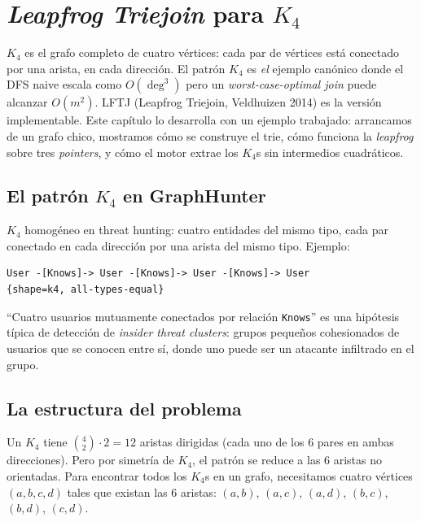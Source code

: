 \chapter{\emph{Leapfrog Triejoin} para \(K_4\)}
\label{cap:lftj}

\begin{intuicion}
\(K_4\) es el grafo completo de cuatro vértices: cada par de
vértices está conectado por una arista, en cada dirección. El
patrón \(K_4\) es \emph{el} ejemplo canónico donde el DFS naive
escala como \(O(\deg^3)\) pero un \emph{worst-case-optimal join}
puede alcanzar \(O(m^2)\). LFTJ (Leapfrog Triejoin, Veldhuizen
2014) es la versión implementable. Este capítulo lo desarrolla con
un ejemplo trabajado: arrancamos de un grafo chico, mostramos cómo
se construye el trie, cómo funciona la \emph{leapfrog} sobre tres
\emph{pointers}, y cómo el motor extrae los \(K_4\)s sin
intermedios cuadráticos.
\end{intuicion}

\section{El patrón \(K_4\) en GraphHunter}

\(K_4\) homogéneo en threat hunting: cuatro entidades del mismo
tipo, cada par conectado en cada dirección por una arista del
mismo tipo. Ejemplo:

\begin{lstlisting}
User -[Knows]-> User -[Knows]-> User -[Knows]-> User
{shape=k4, all-types-equal}
\end{lstlisting}

\noindent
``Cuatro usuarios mutuamente conectados por relación
\texttt{Knows}'' es una hipótesis típica de detección de
\emph{insider threat clusters}: grupos pequeños cohesionados de
usuarios que se conocen entre sí, donde uno puede ser un atacante
infiltrado en el grupo.

\section{La estructura del problema}

Un \(K_4\) tiene \(\binom{4}{2} \cdot 2 = 12\) aristas dirigidas
(cada uno de los 6 pares en ambas direcciones). Pero por simetría
de \(K_4\), el patrón se reduce a las 6 aristas no orientadas.
Para encontrar todos los \(K_4\)s en un grafo, necesitamos cuatro
vértices \((a, b, c, d)\) tales que existan las 6 aristas:
\((a, b)\), \((a, c)\), \((a, d)\), \((b, c)\), \((b, d)\),
\((c, d)\).

